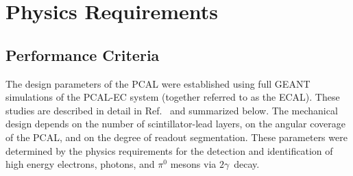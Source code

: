 \section{Physics Requirements}

\subsection{Performance Criteria}

The design parameters of the PCAL were established using full GEANT simulations of the PCAL-EC system
(together referred to as the ECAL). These studies are described in detail in Ref.~\cite{2007001} and
summarized below. The mechanical design depends on the number of scintillator-lead layers, on the angular
coverage of the PCAL, and on the degree of readout segmentation. These parameters were determined by
the physics requirements for the detection and identification of high energy electrons, photons, and $\pi^{0}$
mesons via $2\gamma$\ decay.

